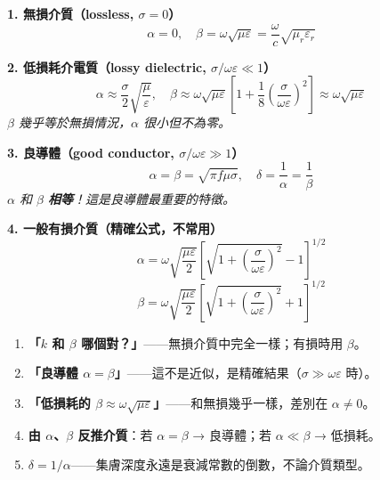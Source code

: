 \documentclass[12pt,a4paper]{article}
\begin{document}
\begin{formulabox}

\textbf{1. 無損介質（lossless, $\sigma = 0$）}
\[
  \alpha = 0, \quad \beta = \omega\sqrt{\mu\varepsilon} = \frac{\omega}{c}\sqrt{\mu_r\varepsilon_r}
\]

\textbf{2. 低損耗介電質（lossy dielectric, $\sigma/\omega\varepsilon \ll 1$）}
\[
  \alpha \approx \frac{\sigma}{2}\sqrt{\frac{\mu}{\varepsilon}}, \quad
  \beta \approx \omega\sqrt{\mu\varepsilon}\left[1 + \frac{1}{8}\left(\frac{\sigma}{\omega\varepsilon}\right)^2\right] \approx \omega\sqrt{\mu\varepsilon}
\]
\textit{$\beta$ 幾乎等於無損情況，$\alpha$ 很小但不為零。}

\textbf{3. 良導體（good conductor, $\sigma/\omega\varepsilon \gg 1$）}
\[
  \boxed{\alpha = \beta = \sqrt{\pi f \mu \sigma}}, \quad \delta = \frac{1}{\alpha} = \frac{1}{\beta}
\]
\textit{$\alpha$ 和 $\beta$ \textbf{相等}！這是良導體最重要的特徵。}

\medskip
\textbf{4. 一般有損介質（精確公式，不常用）}
\[
  \alpha = \omega\sqrt{\frac{\mu\varepsilon}{2}}\left[\sqrt{1+\left(\frac{\sigma}{\omega\varepsilon}\right)^2} - 1\right]^{1/2}
\]
\[
  \beta = \omega\sqrt{\frac{\mu\varepsilon}{2}}\left[\sqrt{1+\left(\frac{\sigma}{\omega\varepsilon}\right)^2} + 1\right]^{1/2}
\]
\end{formulabox}

\begin{conceptbox}[考試常見陷阱]
\begin{enumerate}
  \item \textbf{「$k$ 和 $\beta$ 哪個對？」}——無損介質中完全一樣；有損時用 $\beta$。
  \item \textbf{「良導體 $\alpha = \beta$」}——這不是近似，是精確結果（$\sigma \gg \omega\varepsilon$ 時）。
  \item \textbf{「低損耗的 $\beta \approx \omega\sqrt{\mu\varepsilon}$」}——和無損幾乎一樣，差別在 $\alpha \neq 0$。
  \item \textbf{由 $\alpha$、$\beta$ 反推介質}：若 $\alpha = \beta$ → 良導體；若 $\alpha \ll \beta$ → 低損耗。
  \item \textbf{$\delta = 1/\alpha$}——集膚深度永遠是衰減常數的倒數，不論介質類型。
\end{enumerate}
\end{conceptbox}
\end{document}
